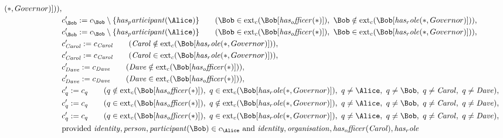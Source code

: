 \begin{align*}
(
\ast
,
Governor
)
]
)
)
,\\
&
c'_
{
\Bob
}
 := 
c_
{
\Bob
}
 \setminus 
\{
\mathit{
has_participant
}
(
\Alice
)
\}
 \qquad (
\Bob
 \in 
\mathrm{ext}_c(
\Bob
[
\mathit{
has_officer
}
(
\ast
)
]
)
,\ 
\Bob
 \notin 
\mathrm{ext}_c(
\Bob
[
\mathit{
has_role
}
(
\ast
,
Governor
)
]
)
)
,\\
&
c'_
{
\Bob
}
 := 
c_
{
\Bob
}
 \setminus 
\{
\mathit{
has_participant
}
(
\Alice
)
\}
 \qquad (
\Bob
 \in 
\mathrm{ext}_c(
\Bob
[
\mathit{
has_officer
}
(
\ast
)
]
)
,\ 
\Bob
 \in 
\mathrm{ext}_c(
\Bob
[
\mathit{
has_role
}
(
\ast
,
Governor
)
]
)
)
,\\
&
c'_
{
\mathit{Carol}
}
 := 
c_
{
\mathit{Carol}
}
 \qquad (
\mathit{Carol}
 \notin 
\mathrm{ext}_c(
\Bob
[
\mathit{
has_role
}
(
\ast
,
Governor
)
]
)
)
,\\
&
c'_
{
\mathit{Carol}
}
 := 
c_
{
\mathit{Carol}
}
 \qquad (
\mathit{Carol}
 \in 
\mathrm{ext}_c(
\Bob
[
\mathit{
has_role
}
(
\ast
,
Governor
)
]
)
)
,\\
&
c'_
{
\mathit{Dave}
}
 := 
c_
{
\mathit{Dave}
}
 \qquad (
\mathit{Dave}
 \notin 
\mathrm{ext}_c(
\Bob
[
\mathit{
has_officer
}
(
\ast
)
]
)
)
,\\
&
c'_
{
\mathit{Dave}
}
 := 
c_
{
\mathit{Dave}
}
 \qquad (
\mathit{Dave}
 \in 
\mathrm{ext}_c(
\Bob
[
\mathit{
has_officer
}
(
\ast
)
]
)
)
,\\
&
c'_
q
 := 
c_
q
 \qquad (
q
 \notin 
\mathrm{ext}_c(
\Bob
[
\mathit{
has_officer
}
(
\ast
)
]
)
,\ 
q
 \in 
\mathrm{ext}_c(
\Bob
[
\mathit{
has_role
}
(
\ast
,
Governor
)
]
)
,\ 
q \neq 
\Alice
,\ 
q \neq 
\Bob
,\ 
q \neq 
\mathit{Carol}
,\ 
q \neq 
\mathit{Dave}
)
,\\
&
c'_
q
 := 
c_
q
 \qquad (
q
 \in 
\mathrm{ext}_c(
\Bob
[
\mathit{
has_officer
}
(
\ast
)
]
)
,\ 
q
 \notin 
\mathrm{ext}_c(
\Bob
[
\mathit{
has_role
}
(
\ast
,
Governor
)
]
)
,\ 
q \neq 
\Alice
,\ 
q \neq 
\Bob
,\ 
q \neq 
\mathit{Carol}
,\ 
q \neq 
\mathit{Dave}
)
,\\
&
c'_
q
 := 
c_
q
 \qquad (
q
 \in 
\mathrm{ext}_c(
\Bob
[
\mathit{
has_officer
}
(
\ast
)
]
)
,\ 
q
 \in 
\mathrm{ext}_c(
\Bob
[
\mathit{
has_role
}
(
\ast
,
Governor
)
]
)
,\ 
q \neq 
\Alice
,\ 
q \neq 
\Bob
,\ 
q \neq 
\mathit{Carol}
,\ 
q \neq 
\mathit{Dave}
)
,\\
&
\text{provided } 
\mathit{
identity
}
,
\mathit{
person
}
,
\mathit{
participant
}
(
\Bob
)
 \in c_
{
\Alice
}
 \text{ and } 
\mathit{
identity
}
,
\mathit{
organisation
}
,
\mathit{
has_officer
}
(
\mathit{Carol}
)
,
\mathit{
has_role
}
\end{align*}
